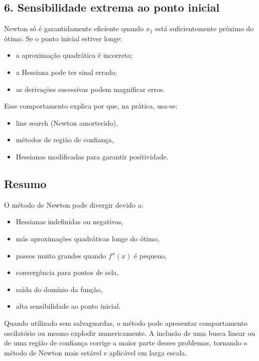 \documentclass[9pt,a4paper]{extarticle}
\begin{document}
\subsection*{6. Sensibilidade extrema ao ponto inicial}

Newton só é garantidamente eficiente quando $x_1$ está suficientemente próximo do 
ótimo. Se o ponto inicial estiver longe:

\begin{itemize}
    \item a aproximação quadrática é incorreta;
    \item a Hessiana pode ter sinal errado;
    \item as derivações sucessivas podem magnificar erros.
\end{itemize}

Esse comportamento explica por que, na prática, usa-se:

\begin{itemize}
    \item line search (Newton amortecido),
    \item métodos de região de confiança,
    \item Hessianas modificadas para garantir positividade.
\end{itemize}

\subsection*{Resumo}

O método de Newton pode divergir devido a:
\begin{itemize}
    \item Hessianas indefinidas ou negativas,
    \item más aproximações quadráticas longe do ótimo,
    \item passos muito grandes quando $f''(x)$ é pequeno,
    \item convergência para pontos de sela,
    \item saída do domínio da função,
    \item alta sensibilidade ao ponto inicial.
\end{itemize}

Quando utilizado sem salvaguardas, o método pode apresentar comportamento
oscilatório ou mesmo explodir numericamente. A inclusão de uma busca linear ou de 
uma região de confiança corrige a maior parte desses problemas, tornando o método 
de Newton mais estável e aplicável em larga escala.
\end{document}
